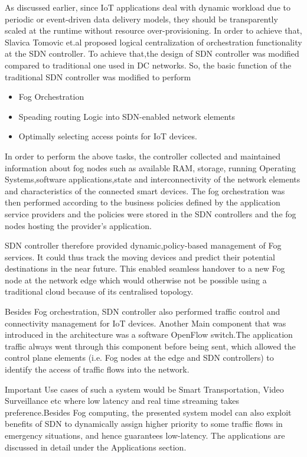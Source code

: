 \documentclass{article}
\begin{document}
As discussed earlier, since IoT applications deal with dynamic workload due to periodic or event-driven data delivery models, they should be transparently scaled at the runtime without resource over-provisioning. In order to achieve that, Slavica Tomovic et.al\cite{tomovic2017software} proposed logical centralization of orchestration functionality at the SDN controller.
To achieve that,the design of SDN controller was modified compared to traditional one used in DC networks\cite{tomovic2017software}.
So, the basic function of the traditional SDN controller was modified to perform
\begin{itemize}
\item Fog Orchestration 
\item Speading routing Logic into SDN-enabled network elements
\item Optimally selecting access points for IoT devices.
\end{itemize}  
In order to perform the above tasks, the controller collected and maintained information about fog nodes such as available RAM, storage, running Operating Systems,software applications,state and interconnectivity of the network elements and characteristics of the connected smart devices.
The fog orchestration was then performed according to the business policies defined by the application service providers and the policies were stored in the SDN controllers and the fog nodes hosting the provider's application\cite{tomovic2017software}.

SDN controller therefore provided dynamic,policy-based management of Fog services. It could thus track the moving devices and predict their potential destinations in the near future. This enabled seamless handover to a new Fog node at the network edge \cite{tomovic2017software}which would otherwise not be possible using a traditional cloud because of its centralised topology.

Besides Fog orchestration, SDN controller also performed traffic control and connectivity management for IoT devices.
Another Main component that was introduced in the architecture was a software OpenFlow switch.The application traffic always went
through this component before being sent, which allowed the control plane elements (i.e. Fog nodes at the edge and SDN controllers) to identify the access of traffic flows into the network\cite{tomovic2017software}. 

Important Use cases of such a system would be Smart Transportation, Video Surveillance etc where low latency and real time streaming takes preference.Besides Fog computing, the presented system model can also exploit benefits of SDN to dynamically assign higher priority to some traffic flows in emergency situations, and hence guarantees low-latency. 
The applications are discussed in detail under the Applications section.
\pagebreak
\end{document}
